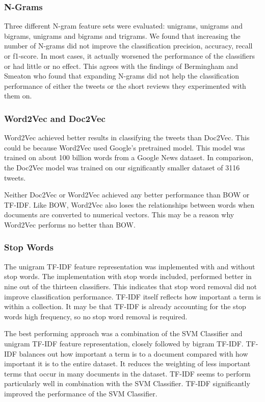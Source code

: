 \subsubsection*{N-Grams}
Three different N-gram feature sets were evaluated: unigrams, unigrams and bigrams, unigrams and bigrams and trigrams. We found that increasing the number of N-grams did not improve the classification precision, accuracy, recall or f1-score. In most cases, it actually worsened the performance of the classifiers or had little or no effect. This agrees with the findings of Bermingham and Smeaton \cite{Berm2010} who found that expanding N-grams did not help the classification performance of either the tweets or the short reviews they experimented with them on. 

\subsubsection*{Word2Vec and Doc2Vec}

Word2Vec achieved better results in classifying the tweets than Doc2Vec. This could be because Word2Vec used Google's pretrained model. This model was trained on about 100 billion words from a Google News dataset. In comparison, the Doc2Vec model was trained on our significantly smaller dataset of 3116 tweets.

Neither Doc2Vec or Word2Vec achieved any better performance than BOW or TF-IDF. Like BOW, Word2Vec also loses the relationships between words when documents are converted to numerical vectors. This may be a reason why Word2Vec performs no better than BOW.

\subsubsection*{Stop Words}

The unigram TF-IDF feature representation was implemented with and without stop words. The implementation with stop words included, performed better in nine out of the thirteen classifiers. This indicates that stop word removal did not improve classification performance. TF-IDF itself reflects how important a term is within a collection. It may be that TF-IDF is already accounting for the stop words high frequency, so no stop word removal is required.\newline

The best performing approach was a combination of the SVM Classifier and unigram TF-IDF feature representation, closely followed by bigram TF-IDF. TF-IDF balances out how important a term is to a document compared with how important it is to the entire dataset. It reduces the weighting of less important terms that occur in many documents in the dataset. TF-IDF seems to perform particularly well in combination with the SVM Classifier. TF-IDF significantly improved the performance of the SVM Classifier.

